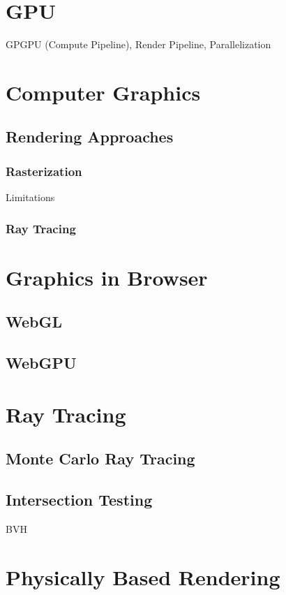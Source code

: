 
\section{GPU}
GPGPU (Compute Pipeline), Render Pipeline, Parallelization
\section{Computer Graphics}
\subsection{Rendering Approaches}
\subsubsection{Rasterization}
Limitations
\subsubsection{Ray Tracing}
\section{Graphics in Browser}
\subsection*{WebGL}
\subsection{WebGPU}

\section{Ray Tracing}
\subsection{Monte Carlo Ray Tracing}
\subsection{Intersection Testing}
BVH

\section{Physically Based Rendering}
